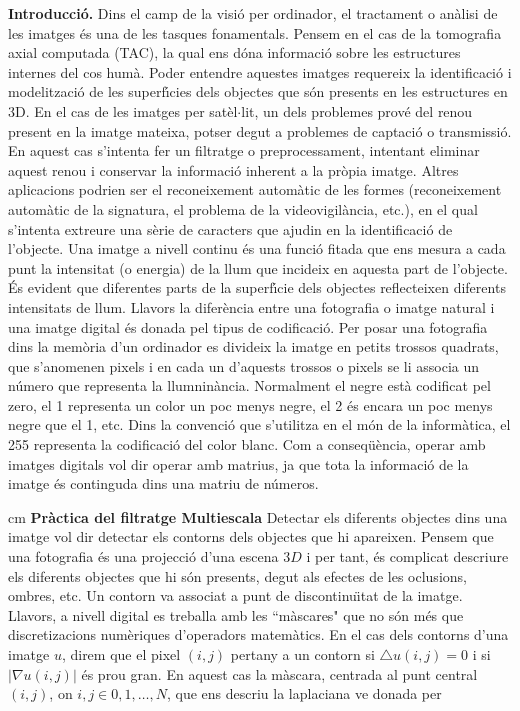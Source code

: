 \documentclass{article}
\begin{document}
\noindent
{\bf Introducci\'{o}.} Dins el camp de la visi\'{o} per ordinador, el
tractament o an\`{a}lisi de les imatges \'{e}s una de les tasques fonamentals. Pensem en el cas de la
tomografia axial computada (TAC), la qual ens d\'{o}na informaci\'{o} sobre les estructures internes del
cos hum\`{a}. Poder entendre aquestes imatges requereix la identificaci\'{o} i modelitzaci\'{o} de les
superf\'{\i}cies dels objectes que s\'{o}n presents en les estructures en 3D. En el cas de les imatges per
sat\`{e}l$\cdot$lit, un dels problemes prov\'{e} del renou present en la imatge mateixa, potser degut a problemes
de captaci\'{o} o transmissi\'{o}. En aquest cas s'intenta fer un filtratge o preprocessament, intentant
eliminar aquest renou i conservar la informaci\'{o} inherent a la pr\`{o}pia imatge. Altres aplicacions
podrien ser el reconeixement autom\`{a}tic de les formes (reconeixement autom\`{a}tic de la signatura, el
problema de la videovigil\`{a}ncia, etc.), en el qual s'intenta extreure una s\`{e}rie de caracters que
ajudin en la identificaci\'{o} de l'objecte. Una imatge a nivell continu \'{e}s una funci\'{o} fitada que ens
mesura a cada punt la intensitat (o energia) de la llum que incideix en aquesta part de l'objecte.
\'{E}s evident que diferentes parts de la superf\'{\i}cie dels objectes reflecteixen diferents intensitats
de llum. Llavors la difer\`{e}ncia entre una fotografia o imatge natural i una imatge digital \'{e}s donada
pel tipus de codificaci\'{o}. Per posar una fotografia dins la mem\`{o}ria d'un ordinador es divideix la
imatge en petits trossos quadrats, que s'anomenen pixels i en cada un d'aquests trossos o pixels se
li associa un n\'umero que representa la llumnin\`{a}ncia. Normalment el negre est\`{a} codificat pel zero,
el 1 representa un color un poc menys negre, el 2 \'{e}s encara un poc menys negre que el 1, etc. Dins
la convenci\'{o} que s'utilitza en el m\'{o}n de la inform\`{a}tica, el 255 representa la codificaci\'{o} del color
blanc. Com a conseq\"{u}\`{e}ncia, operar amb imatges digitals vol dir operar amb matrius, ja que tota la
informaci\'{o} de la imatge \'{e}s continguda dins una matriu de n\'umeros.

 cm
\noindent
{\bf Pr\`{a}ctica del filtratge Multiescala} Detectar els diferents objectes dins una imatge vol dir
detectar els contorns dels objectes que hi apareixen. Pensem que una fotografia \'{e}s una projecci\'{o}
d'una escena $3D$ i per tant, \'{e}s complicat descriure els diferents objectes que hi s\'{o}n presents,
degut als efectes de les oclusions, ombres, etc. Un contorn va associat a punt de discontinu\"{\i}tat de
la imatge. Llavors, a nivell digital es treballa amb les ``m\`{a}scares" que no s\'{o}n m\'{e}s que
discretizacions num\`{e}riques d'operadors matem\`{a}tics. En el cas dels contorns d'una imatge $u$, direm
que el pixel $(i,j)$ pertany a un contorn si $\triangle u(i,j)=0$ i si $|\nabla u(i,j)|$ \'{e}s prou
gran. En aquest cas la m\`{a}scara, centrada al punt central $(i,j)$, on $i,j \in 0,1,\ldots,N$, que
ens descriu la laplaciana ve donada per
\end{document}
